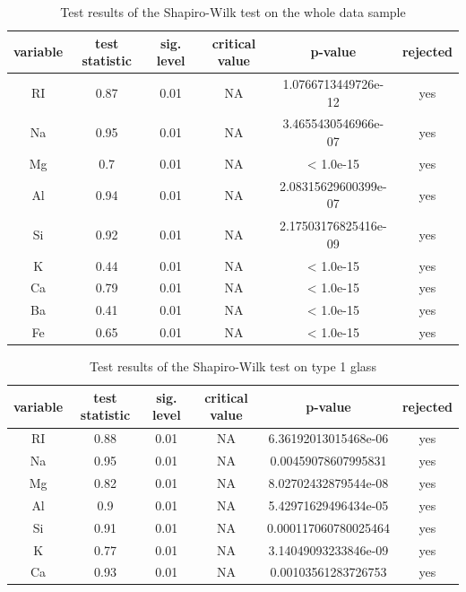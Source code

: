 \documentclass[a4paper, 12pt, titlepage, headsepline, listof = totoc, bibliography = totoc, numbers = noenddot]{scrartcl}
\begin{document}
\begin{table}[h!]
\centering
\begin{tabular}{|cccccc|} \hline variable & test statistic & sig. level & critical value & p-value & rejected\\ \hline RI & 0.87 & 0.01 & NA & 1.0766713449726e-12 & yes\\ 
Na & 0.95 & 0.01 & NA & 3.4655430546966e-07 & yes\\ 
Mg & 0.7 & 0.01 & NA & < 1.0e-15 & yes\\ 
Al & 0.94 & 0.01 & NA & 2.08315629600399e-07 & yes\\ 
Si & 0.92 & 0.01 & NA & 2.17503176825416e-09 & yes\\ 
K & 0.44 & 0.01 & NA & < 1.0e-15 & yes\\ 
Ca & 0.79 & 0.01 & NA & < 1.0e-15 & yes\\ 
Ba & 0.41 & 0.01 & NA & < 1.0e-15 & yes\\ 
Fe & 0.65 & 0.01 & NA & < 1.0e-15 & yes\\ \hline \end{tabular}\caption{Test results of the Shapiro-Wilk test on the whole data sample}
\label{tab:testresFullSW}
\end{table}

\begin{table}[h!]
\centering
\begin{tabular}{|cccccc|} \hline variable & test statistic & sig. level & critical value & p-value & rejected\\ \hline RI & 0.88 & 0.01 & NA & 6.36192013015468e-06 & yes\\ 
Na & 0.95 & 0.01 & NA & 0.00459078607995831 & yes\\ 
Mg & 0.82 & 0.01 & NA & 8.02702432879544e-08 & yes\\ 
Al & 0.9 & 0.01 & NA & 5.42971629496434e-05 & yes\\ 
Si & 0.91 & 0.01 & NA & 0.000117060780025464 & yes\\ 
K & 0.77 & 0.01 & NA & 3.14049093233846e-09 & yes\\ 
Ca & 0.93 & 0.01 & NA & 0.00103561283726753 & yes\\ \hline \end{tabular}\caption{Test results of the Shapiro-Wilk test on type 1 glass}
\label{tab:testrestype1SW}
\end{table}
\end{document}
